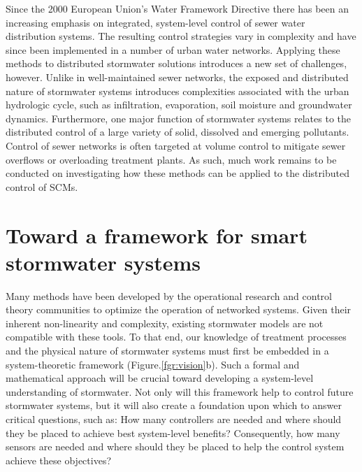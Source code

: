 Since the 2000 European Union's Water Framework Directive \cite{TheEuropeanParliamentandthecouncilofEuropeanUnion2000DirectivePolicy} there has been an increasing emphasis on integrated, system-level control of sewer water distribution systems.
The resulting control strategies vary in complexity\cite{Benedetti2009AScale,Seggelke2013ImplementationWilhelmshaven,Fiorelli2013OptimisedFunction}  and have since been implemented in a number of urban water networks\cite{Mollerup2016ControllingCities}.
Applying these methods to distributed stormwater solutions introduces a new set of challenges, however. Unlike in well-maintained sewer networks, the exposed and distributed  nature of stormwater systems introduces complexities associated with the urban hydrologic cycle, such as infiltration, evaporation, soil moisture and groundwater dynamics. Furthermore, one major function of stormwater systems relates to the  distributed control of  a large variety of solid, dissolved and emerging pollutants. Control of sewer networks is often targeted at volume control to mitigate sewer overflows or overloading treatment plants. As such, much work remains to be conducted on investigating how these methods can be applied to the distributed control of SCMs. 



\section{Toward a framework for smart stormwater systems}
 
Many methods have been developed by the operational research and control theory communities to optimize the operation of networked systems\cite{Sheffi1984UrbanNetworks,Astrom2006FeedbackEngineers}. Given their inherent non-linearity and complexity, existing stormwater models are not compatible with these tools. To that end, our knowledge of treatment processes and the physical nature of stormwater systems must first be embedded in a system-theoretic framework (Figure.\ref{fgr:vision}b). Such a formal and mathematical approach will be crucial toward developing a system-level understanding of stormwater. Not only will this framework help to control future stormwater systems, but it will also create a foundation upon which to answer critical questions, such as: How many controllers are needed and where should they be placed to achieve best system-level benefits?  Consequently, how many sensors are needed and where should they be placed to help the control system achieve these objectives? 

